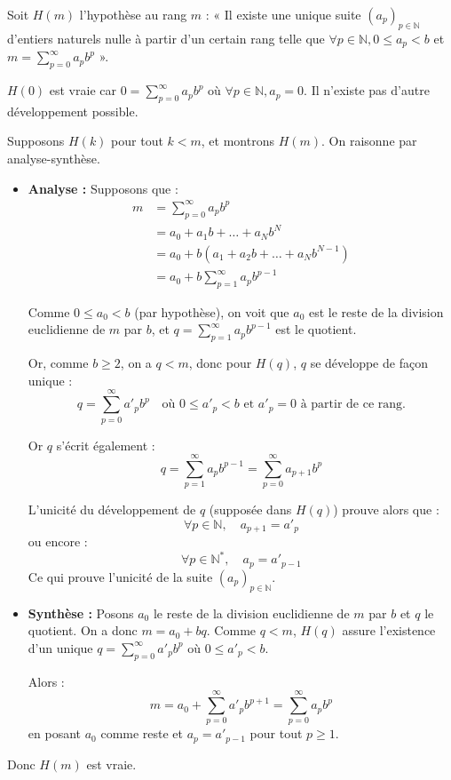 \documentclass[a4paper,11pt]{article}
\newcommand{\N}{\mathbb{N}}
\begin{document}
\begin{demonstration}
Soit $H(m)$ l'hypothèse au rang $m$ : « Il existe une unique suite $(a_p)_{p \in \N}$ d'entiers naturels nulle à partir d'un certain rang telle que $\forall p \in \N, 0 \le a_p < b$ et $m = \sum_{p=0}^{\infty} a_p b^p$ ».

$H(0)$ est vraie car $0 = \sum_{p=0}^{\infty} a_p b^p$ où $\forall p \in \N, a_p = 0$. Il n'existe pas d'autre développement possible.

Supposons $H(k)$ pour tout $k < m$, et montrons $H(m)$. On raisonne par analyse-synthèse.

\begin{itemize}
    \item \textbf{Analyse :} Supposons que :
    \begin{align*}
        m &= \sum_{p=0}^{\infty} a_p b^p \\
        &= a_0 + a_1 b + \dots + a_N b^N \\
        &= a_0 + b(a_1 + a_2 b + \dots + a_N b^{N-1}) \\
        &= a_0 + b \sum_{p=1}^{\infty} a_p b^{p-1}
    \end{align*}

Comme $0 \le a_0 < b$ (par hypothèse), on voit que $a_0$ est le reste de la division euclidienne de $m$ par $b$, et $q = \sum_{p=1}^{\infty} a_p b^{p-1}$ est le quotient.

Or, comme $b \ge 2$, on a $q < m$, donc pour $H(q)$, $q$ se développe de façon unique :
$$ q = \sum_{p=0}^{\infty} a'_p b^p \quad \text{où } 0 \le a'_p < b \text{ et } a'_p = 0 \text{ à partir de ce rang.} $$

Or $q$ s'écrit également :
$$ q = \sum_{p=1}^{\infty} a_p b^{p-1} = \sum_{p=0}^{\infty} a_{p+1} b^p $$

L'unicité du développement de $q$ (supposée dans $H(q)$) prouve alors que :
$$ \forall p \in \N, \quad a_{p+1} = a'_p $$
ou encore :
$$ \forall p \in \N^*, \quad a_p = a'_{p-1} $$
Ce qui prouve l'unicité de la suite $(a_p)_{p \in \N}$.

    \item \textbf{Synthèse :} Posons $a_0$ le reste de la division euclidienne de $m$ par $b$ et $q$ le quotient. 
    On a donc $m = a_0 + bq$. Comme $q < m$, $H(q)$ assure l'existence d'un unique $q = \sum_{p=0}^{\infty} a'_p b^p$ où $0 \le a'_p < b$. 
    
    Alors :
    $$ m = a_0 + \sum_{p=0}^{\infty} a'_p b^{p+1} = \sum_{p=0}^{\infty} a_p b^p $$
    en posant $a_0$ comme reste et $a_p = a'_{p-1}$ pour tout $p \ge 1$.
\end{itemize}

Donc $H(m)$ est vraie.
\end{demonstration}
\end{document}
